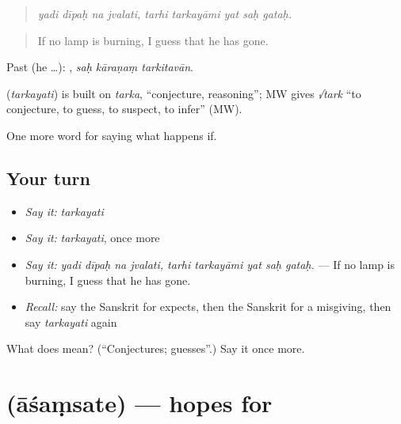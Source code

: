 \begin{quote}
\emph{yadi dīpaḥ na jvalati, tarhi tarkayāmi yat saḥ gataḥ.}
\end{quote}

\begin{quote}
If no lamp is burning, I guess that he has gone.
\end{quote}

Past (he …):   , \emph{saḥ kāraṇaṃ tarkitavān}.

\begin{cousinweb}
\textbf{} (\emph{tarkayati}) is built on \emph{tarka}, \textquotedblleft{}conjecture, reasoning\textquotedblright{}; MW gives \emph{√tark} \textquotedblleft{}to conjecture, to guess, to suspect, to infer\textquotedblright{} (MW).
\end{cousinweb}

\begin{grammarlens}[title={What you've built}]
One more word for saying what happens if.
\end{grammarlens}

\subsection*{Your turn}
\begin{itemize}
\raggedright
  \item \emph{Say it:} \emph{tarkayati}
  \item \emph{Say it:} \emph{tarkayati}, once more
  \item \emph{Say it:} \emph{yadi dīpaḥ na jvalati, tarhi tarkayāmi yat saḥ gataḥ.} — If no lamp is burning, I guess that he has gone.
  \item \emph{Recall:} say the Sanskrit for expects, then the Sanskrit for a misgiving, then say \emph{tarkayati} again
\end{itemize}

\begin{tcolorbox}[breakable,colback=teal!4,colframe=teal!35!black,title={Before you move on}]
What does  mean? (\textquotedblleft{}Conjectures; guesses\textquotedblright{}.) Say it once more.
\end{tcolorbox}
\section[\texorpdfstring{\sk{आशंसते} (āśaṃsate)}{आशंसते (āśaṃsate)}]{ (āśaṃsate) — hopes for}

